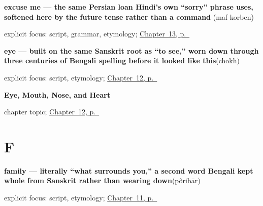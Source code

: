 \noindent\begin{minipage}[t]{\linewidth}
\raggedright
\textbf{excuse me — the same Persian loan Hindi's own \textquotedblleft{}sorry\textquotedblright{} phrase uses, softened here by the future tense rather than a command}\enspace\emph{ }\enspace(maf korben)\par
\footnotesize explicit focus: script, grammar, etymology; \hyperref[ch:bn-please-sorry-welcome]{Chapter~13, p.~\pageref*{ch:bn-please-sorry-welcome}}
\end{minipage}\par\smallskip

\noindent\begin{minipage}[t]{\linewidth}
\raggedright
\textbf{eye — built on the same Sanskrit root as \textquotedblleft{}to see,\textquotedblright{} worn down through three centuries of Bengali spelling before it looked like this}\enspace\emph{}\enspace(chokh)\par
\footnotesize explicit focus: script, etymology; \hyperref[ch:bn-eye-mouth-nose-heart]{Chapter~12, p.~\pageref*{ch:bn-eye-mouth-nose-heart}}
\end{minipage}\par\smallskip

\noindent\begin{minipage}[t]{\linewidth}
\raggedright
\textbf{Eye, Mouth, Nose, and Heart}\par
\footnotesize chapter topic; \hyperref[ch:bn-eye-mouth-nose-heart]{Chapter~12, p.~\pageref*{ch:bn-eye-mouth-nose-heart}}
\end{minipage}\par\smallskip

\section*{F}

\noindent\begin{minipage}[t]{\linewidth}
\raggedright
\textbf{family — literally \textquotedblleft{}what surrounds you,\textquotedblright{} a second word Bengali kept whole from Sanskrit rather than wearing down}\enspace\emph{}\enspace(pôribār)\par
\footnotesize explicit focus: script, etymology; \hyperref[ch:bn-friend-family-brother-sister]{Chapter~11, p.~\pageref*{ch:bn-friend-family-brother-sister}}
\end{minipage}\par\smallskip

